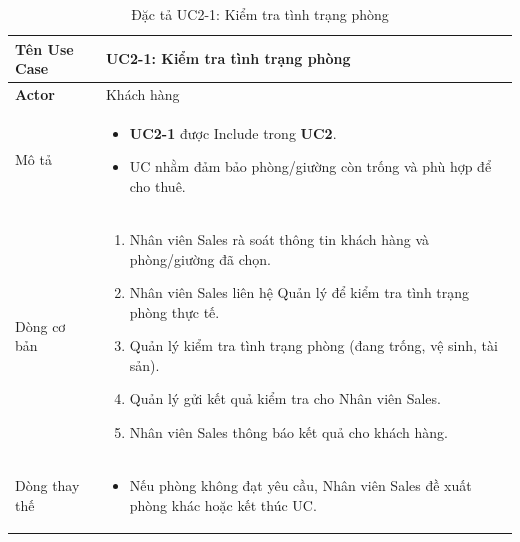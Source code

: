 \noindent
\begin{table}[H]
    \centering
\begin{tabularx}{\textwidth}{|>{\centering\arraybackslash\bfseries}m{3.5cm}|X|}
    \hline
    Tên Use Case & {\centering\textbf{UC2-1: Kiểm tra tình trạng phòng}\par} \\ 
    \hline
    
    Actor & Khách hàng \\ 
    \hline

    Mô tả &
    \vspace{0.2cm}
    \begin{itemize}[leftmargin=*, nosep, label=-]
        \item \textbf{UC2-1} được Include trong \textbf{UC2}.
        \item UC nhằm đảm bảo phòng/giường còn trống và phù hợp để cho thuê.
    \end{itemize} \\ 
    \hline
    
    Dòng cơ bản &
    \vspace{0.2cm}
    \begin{enumerate}[leftmargin=*, nosep]
        \item Nhân viên Sales rà soát thông tin khách hàng và phòng/giường đã chọn.
        \item Nhân viên Sales liên hệ Quản lý để kiểm tra tình trạng phòng thực tế.
        \item Quản lý kiểm tra tình trạng phòng (đang trống, vệ sinh, tài sản).
        \item Quản lý gửi kết quả kiểm tra cho Nhân viên Sales.
        \item Nhân viên Sales thông báo kết quả cho khách hàng.
    \end{enumerate} \\ 
    \hline
    
    Dòng thay thế &
    \vspace{0.2cm}
    \begin{itemize}[leftmargin=*, nosep, label=-]
        \item Nếu phòng không đạt yêu cầu, Nhân viên Sales đề xuất phòng khác hoặc kết thúc UC.
    \end{itemize} \\ 
    \hline
\end{tabularx}
\caption{Đặc tả UC2-1: Kiểm tra tình trạng phòng}
\end{table}

\vspace{0.5cm}

